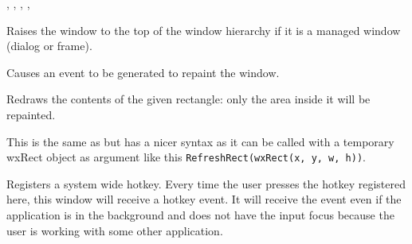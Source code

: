 
,\rtfsp
{},\rtfsp
{},\rtfsp
{},\rtfsp
{}


\label{wxwindowraise}


Raises the window to the top of the window hierarchy if it is a managed window (dialog
or frame).


\label{wxwindowrefresh}


Causes an event to be generated to repaint the
window.







\label{wxwindowrefreshrect}


Redraws the contents of the given rectangle: only the area inside it will be
repainted.

This is the same as  but has a nicer syntax
as it can be called with a temporary wxRect object as argument like this
\texttt{RefreshRect(wxRect(x, y, w, h))}.


\label{wxwindowregisterhotkey}


Registers a system wide hotkey. Every time the user presses the hotkey registered here, this window
will receive a hotkey event. It will receive the event even if the application is in the background
and does not have the input focus because the user is working with some other application.

